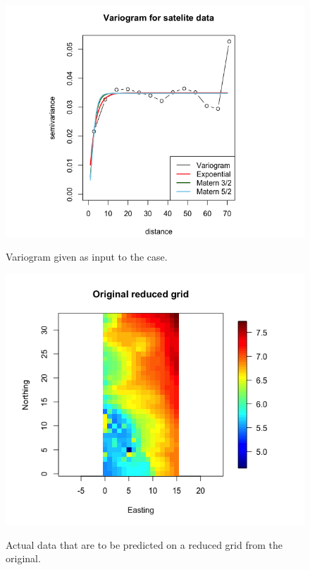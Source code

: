 \begin{figure}[p]
	\includegraphics[width=1.4\linewidth]{figurer/variogram_covariancefunctions.png}
    \caption{Variogram given as input to the case.}
    \label{fig:variogram}
	\endminipage\hfill
  \includegraphics[width=1.4\linewidth]{figurer/original_reduced.png}
   \label{fig:original_data}
	 \caption{Actual data that are to be predicted on a reduced grid from the original.}
\endminipage
\end{figure}

